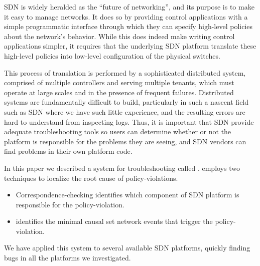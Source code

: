 SDN is widely heralded as the ``future of networking'', and its purpose is to make it easy to manage networks.  It does so by providing control applications with a simple programmatic interface through which they can specify high-level policies about the network's behavior. While this does indeed make writing control applications simpler, it requires that the underlying SDN platform translate these high-level policies into low-level configuration of the physical switches.

This process of translation is performed by a sophisticated distributed system, comprised of multiple controllers and serving multiple tenants, which must operate at large scales and in the presence of frequent failures. Distributed systems are fundamentally difficult to build, particularly in such a nascent field such as SDN where we have such little experience, and the resulting errors are hard to understand from inspecting logs. Thus, it is important that SDN provide adequate troubleshooting tools so users can determine whether or not the platform is responsible for the problems they are seeing, and SDN vendors can find problems in their own platform code.

In this paper we described a system for troubleshooting called \projectname{}. \projectname{} employs two techniques to localize the root cause of policy-violations.\begin{itemize}
    \item Correspondence-checking identifies which component of SDN platform is responsible for the policy-violation.
    \item  \simulator{} identifies the minimal causal set network events that trigger the policy-violation.
\end{itemize}

We have applied this system to several available SDN platforms, quickly finding bugs in all the platforms we investigated. 